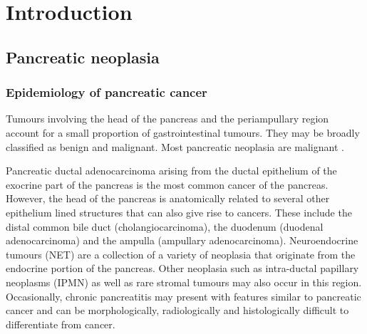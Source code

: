 
\chapter{Introduction}
\label{ch_intro}


\clearpage
\section{Pancreatic neoplasia}

\subsection{Epidemiology of pancreatic cancer}
Tumours involving the head of the pancreas and the periampullary region account for a small proportion of gastrointestinal tumours. 
They may be broadly classified as benign and malignant. 
Most pancreatic neoplasia are malignant \parencite{li_pancreatic_2004}. 

Pancreatic ductal adenocarcinoma arising from the ductal epithelium of the exocrine part of the pancreas is the most common cancer of the pancreas. 
However, the head of the pancreas is anatomically related to several other epithelium lined structures that can also give rise to cancers. 
These include the distal common bile duct (cholangiocarcinoma), the duodenum (duodenal adenocarcinoma) and the ampulla (ampullary adenocarcinoma). 
Neuroendocrine tumours (NET) are a collection of a variety of neoplasia that originate from the endocrine portion of the pancreas. 
Other neoplasia such as intra-ductal papillary neoplasms (IPMN) as well as rare stromal tumours may also occur in this region. 
Occasionally, chronic pancreatitis may present with features similar to pancreatic cancer and can be morphologically, radiologically and histologically difficult to differentiate from cancer.

